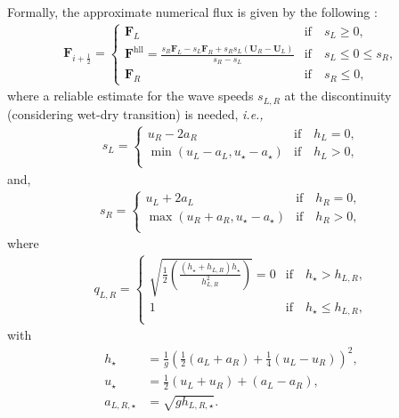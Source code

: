 \documentclass[a4paper]{article}
\numberwithin{equation}{section}
\newcommand{\ie}{\textit{i.e.,} }
\begin{document}
	Formally, the approximate numerical flux is given by the following \parencite{toro2001,huang2013,toro2013,toro2019}:
	\begin{align}\label{hll_fluxes}
		\mathbf{F}_{i+\frac{1}{2}}=
		\begin{cases}
			\mathbf{F}_{L} & \text{if}\quad s_L \geq 0, \\
			\mathbf{F}^{\mathrm{hll}}=\frac{ s_R\mathbf{F}_{L}-s_L\mathbf{F}_{R}+s_Rs_L(\mathbf{U}_{R}-\mathbf{U}_{L}) }{s_R-s_L}& \text{if} \quad s_L \leq 0 \leq s_R,\\
			\mathbf{F}_{R}& \text{if}\quad s_R \leq 0,
		\end{cases} 
	\end{align}
	where a reliable estimate for the wave speeds $s_{L,R}$ at the discontinuity (considering wet-dry transition) is needed, \ie
	\begin{align}
		s_L=
\begin{cases}
u_R - 2a_R & \text{if}\quad h_L = 0, \\
\min(u_L - a_L,u_{\star} - a_{\star}) & \text{if}\quad h_L > 0, \\
\end{cases} 
	\end{align} 
and,
	\begin{align}
	s_R=
	\begin{cases}
		u_L + 2a_L & \text{if}\quad h_R = 0, \\
		\max(u_R +a_R, u_{\star} - a_{\star}) & \text{if}\quad h_R > 0, \\
	\end{cases} 
\end{align} 
where
	\begin{align}
	q_{L,R}=
	\begin{cases}
		\sqrt{\frac{1}{2}(\frac{(h_{\star}+h_{L,R})h_{\star}}{h^2_{L,R}})} = 0 & \text{if}\quad h_{\star} > h_{L,R}, \\
		1 & \text{if}\quad h_{\star} \leq h_{L,R}, \\
	\end{cases} 
\end{align}
with 
\begin{align}
	h_{\star}&=\frac{1}{g}\left(\frac{1}{2}(a_L+a_R)+\frac{1}{4}(u_L-u_R)\right)^2, \\
	u_{\star}&=\frac{1}{2}(u_L+u_R)+(a_L-a_R),\\
	a_{L,R,\star}&=\sqrt{g h_{L,R,\star}}.
\end{align}
	
\end{document}
